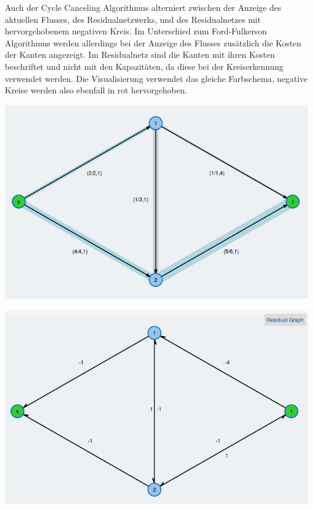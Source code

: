 Auch der Cycle Canceling Algorithmus alterniert zwischen der Anzeige des aktuellen Flusses, des Residualnetzwerks, und des Residualnetzes mit hervorgehobenem negativen Kreis. Im Unterschied zum Ford-Fulkerson Algorithmus werden allerdings bei der Anzeige des Flusses zusätzlich die Kosten der Kanten angezeigt. Im Residualnetz sind die Kanten mit ihren Kosten beschriftet und nicht mit den Kapazitäten, da diese bei der Kreiserkennung verwendet werden. Die Visualisierung verwendet das gleiche Farbschema, negative Kreise werden also ebenfall in rot hervorgehoben.

\begin{center}
\begin{minipage}[t]{0.70\textwidth}
    \includegraphics[width=\textwidth]{img/cycle-canceling-1.jpg}
\end{minipage}
\end{center}


\begin{center}
\begin{minipage}[t]{0.70\textwidth}
    \includegraphics[width=\textwidth]{img/cycle-canceling-2.jpg}
\end{minipage}
\end{center}


